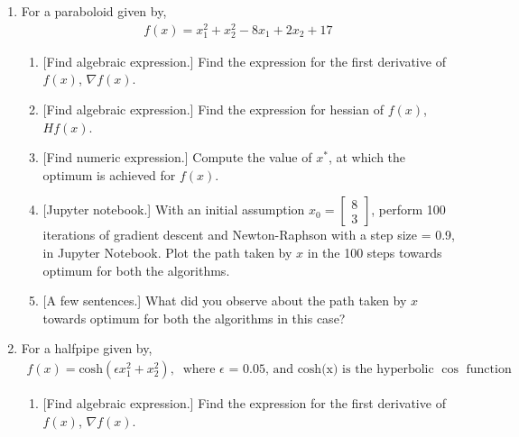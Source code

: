 \begin{enumerate}
    \item 
    For a paraboloid given by,
    \begin{align*}
        f(x) = x_1^2 + x_2^2 - 8x_1 + 2x_2 + 17
    \end{align*}
    \begin{enumerate}
        \item 
        {[Find algebraic expression.]} Find the expression for the first derivative of $f(x)$, $\nabla f(x)$.
        
        \sol{
        
        }
        \item
        {[Find algebraic expression.]} Find the expression for hessian of $f(x)$, $Hf(x)$.
        
        \sol{
        
        }
        \item
        {[Find numeric expression.]} Compute the value of $x^*$, at which the optimum is achieved for $f(x)$.
        
        \sol{
        
        }
        \item
        {[Jupyter notebook.]}
        With an initial assumption $x_0 = \begin{bmatrix}8\\3\end{bmatrix}$, perform 100 iterations of gradient descent and Newton-Raphson with a step size = 0.9, in Jupyter Notebook. Plot the path taken by $x$ in the 100 steps towards optimum for both the algorithms.
        
        \sol{
        
        }
        \item \label{part1} {[A few sentences.]}
        What did you observe about the path taken by $x$ towards optimum for both the algorithms in this case?
        
        \sol{
        
        }
    \end{enumerate}
    \item
    For a halfpipe given by,
    \begin{align*}
        f(x) = \text{cosh}(\epsilon x_1^2 + x_2^2),\;\;\text{where $\epsilon$ = 0.05, and cosh(x) is the hyperbolic $\cos$ function}
    \end{align*}
    \begin{enumerate}
        \item 
        {[Find algebraic expression.]}
        Find the expression for the first derivative of $f(x)$, $\nabla f(x)$.
        

\end{enumerate}
\end{enumerate}
